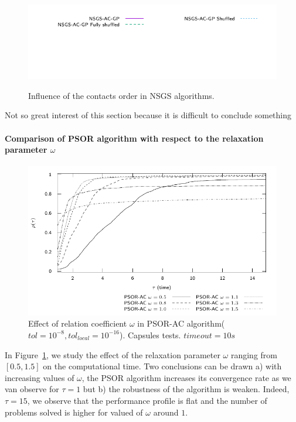 \begin{figure}
{   \hspace{-1cm} \includegraphics[width=\widthfigure\textwidth]{../figure/NSGS/Shuffled/time/profile-Cubes_H8_20_legend.pdf}
  }
  \caption{Influence of the contacts order in NSGS algorithms.}
\end{figure}

\begin{ndrva}
  \item Not so great interest of this section because it is difficult to conclude something
\end{ndrva}

\paragraph{Comparison of PSOR algorithm with respect to  the relaxation parameter $\omega$}

\begin{figure}
  \centering
  \includegraphics[width=\widthfigure\textwidth]{../figure/profile-Capsules-PSOR-1_15-time.pdf}
  \caption{Effect of relation coefficient $\omega$ in PSOR-AC algorithm( $tol = 10^{-8}, tol_{local} = 10^{-16}$). Capsules tests. $timeout=10s$}
  \label{fig:profile-Capsules-PSOR-1_15-time}
\end{figure}

In Figure~\ref{fig:profile-Capsules-PSOR-1_15-time}, we study the effect of the relaxation parameter $\omega$ ranging from $[0.5,1.5]$ on the computational time.  Two conclusions can be drawn a) with increasing values of $\omega$, the PSOR algorithm increases its convergence rate as we van observe for $\tau=1$ but b) the robustness of the algorithm is weaken. Indeed, $\tau=15$, we observe that the performance profile is flat and the number of problems solved is higher for valued of $\omega$ around $1$.

